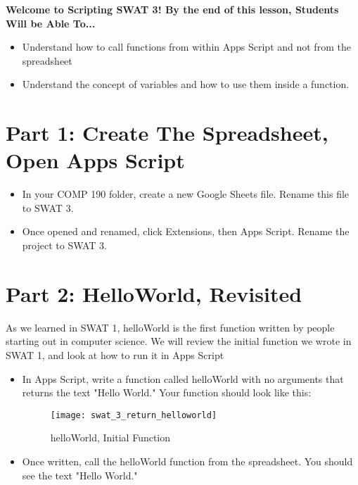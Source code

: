 \documentclass{article}
\newcommand{\AName}{Scripting SWAT 3}
\begin{document}
\textbf{Welcome to \AName!  By the end of this lesson, Students Will be Able To...}
\begin{itemize}
    \item Understand how to call functions from within Apps Script and not from the spreadsheet
    \item Understand the concept of variables and how to use them inside a function.
\end{itemize}


\section*{Part 1: Create The Spreadsheet, Open Apps Script}
\begin{itemize}
    \item In your COMP 190 folder, create a new Google Sheets file.  Rename this file to SWAT 3.
    \item Once opened and renamed, click Extensions, then Apps Script.  Rename the project to SWAT 3.
\end{itemize}

\section*{Part 2: HelloWorld, Revisited}
As we learned in SWAT 1, helloWorld is the first function written by people starting out in computer science.  We will review the initial function we wrote in SWAT 1, and look at how to run it in Apps Script
\begin{itemize}
	\item In Apps Script, write a function called helloWorld with no arguments that returns the text "Hello World."  Your function should look like this:
	\begin{figure}[H]
  		\centering
  		\texttt{[image: swat\_3\_return\_helloworld]}
  		\caption{helloWorld, Initial Function}
	\end{figure}
	\item Once written, call the helloWorld function from the spreadsheet.  You should see the text "Hello World."
\end{itemize}
\end{document}
